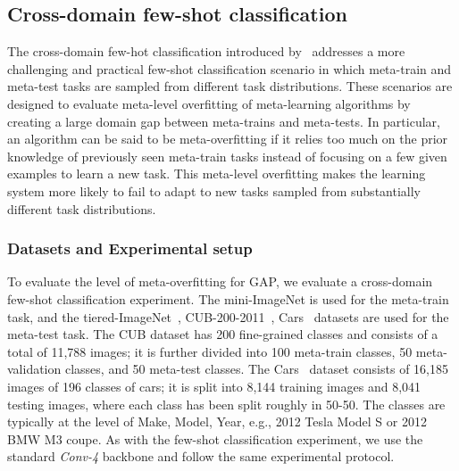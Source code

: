 \subsection{Cross-domain few-shot classification}
The cross-domain few-hot classification introduced by~\cite{chen2019closer} addresses a more challenging and practical few-shot classification scenario in which meta-train and meta-test tasks are sampled from different task distributions. These scenarios are designed to evaluate meta-level overfitting of meta-learning algorithms by creating a large domain gap between meta-trains and meta-tests. In particular, an algorithm can be said to be meta-overfitting if it relies too much on the prior knowledge of previously seen meta-train tasks instead of focusing on a few given examples to learn a new task. This meta-level overfitting makes the learning system more likely to fail to adapt to new tasks sampled from substantially different task distributions.

\subsubsection{Datasets and Experimental setup}
To evaluate the level of meta-overfitting for GAP, we evaluate a cross-domain few-shot classification experiment.
The mini-ImageNet is used for the meta-train task, and the tiered-ImageNet~\cite{ren2018meta}, CUB-200-2011~\cite{wah2011caltech}, Cars~\cite{bertinetto2018meta} datasets are used for the meta-test task. The CUB dataset has 200 fine-grained classes and consists of a total of 11,788 images; it is further divided into 100 meta-train classes, 50 meta-validation classes, and 50 meta-test classes. 
The Cars~\cite{krause20133d} dataset consists of 16,185 images of 196 classes of cars; it is split into 8,144 training images and 8,041 testing images, where each class has been split roughly in 50-50. The classes are typically at the level of Make, Model, Year, e.g., 2012 Tesla Model S or 2012 BMW M3 coupe.
As with the few-shot classification experiment, we use the standard \textit{Conv-4} backbone and follow the same experimental protocol.

